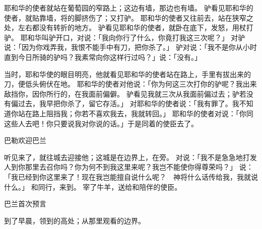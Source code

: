 {耶和华的使者就站在葡萄园的窄路上；这边有墙，那边也有墙。
驴看见耶和华的使者，就贴靠墙，将{}的脚挤伤了；{}又打驴。
耶和华的使者又往前去，站在狭窄之处，左右都没有转折的地方。
驴看见耶和华的使者，就卧在{}底下，{}发怒，用杖打驴。
耶和华叫驴开口，对{}说：「我向你行了什么，你竟打我这三次呢？」
对驴说：「因为你戏弄我，我恨不能手中有刀，把你杀了。」
驴对{}说：「我不是你从小时直到今日所骑的驴吗？我素常向你这样行过吗？」{}说：「没有。」
\par }{\PP {}当时，耶和华使{}的眼目明亮，他就看见耶和华的使者站在路上，手里有拔出来的刀，{}便低头俯伏在地。
耶和华的使者对他说：「你为何这三次打你的驴呢？我出来敌挡你，因你所行的，在我面前偏僻。
驴看见我就三次从我面前偏过去；驴若没有偏过去，我早把你杀了，留它存活。」
对耶和华的使者说：「我有罪了。我不知道你站在路上阻挡我；你若不喜欢我去，我就转回。」
耶和华的使者对{}说：「你同这些人去吧！你只要说我对你说的话。」于是{}同着{}的使臣去了。
\par }{\SH 巴勒欢迎巴兰
\par }{\PP {}听见{}来了，就往{}{}城去迎接他；这城是在边界上，在{}旁。
对{}说：「我不是急急地打发人到你那里去召你吗？你为何不到我这里来呢？我岂不能使你得尊荣吗？」
说：「我已经到你这里来了！现在我岂能擅自说什么呢？　神将什么话传给我，我就说什么。」
和{}同行，来到{}。
宰了牛羊，送给{}和陪伴的使臣。
\par }{\SH 巴兰首次预言
\par }{\PP {}到了早晨，{}领{}到{}的高处；{}从那里观看{}{}的边界。

}
